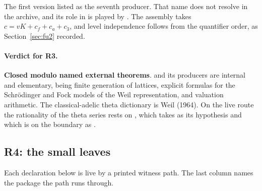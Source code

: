 \documentclass[11pt]{article}
\newcommand{\sE}{\textbf{Closed modulo named external theorems}}
\theoremstyle{remark}
\begin{document}
The first version listed  as the seventh producer. That name does not resolve in the archive, and its role in  is played by . The assembly takes $c=vK+c_f+c_a+c_3$, and level independence follows from the quantifier order, as Section~\ref{sec:fu2} recorded.

\paragraph{Verdict for R3.} \sE.  and its producers are internal and elementary, being finite generation of lattices, explicit formulas for the Schr\"odinger and Fock models of the Weil representation, and valuation arithmetic. The classical-adelic theta dictionary is Weil (1964). On the live route the rationality of the theta series rests on , which  takes as its hypothesis and which is on the boundary as .

\subsection{R4: the small leaves}\label{sec:fu4r4}

Each declaration below is live by a printed witness path. The last column names the package the path runs through.
\end{document}
